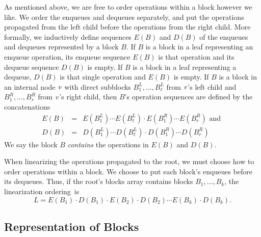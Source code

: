 As mentioned above, we are free to order operations within a block however we like.
We order the enqueues and dequeues separately, and put the 
operations propagated from the left child before the operations from the right child.
More formally, we inductively define sequences $E(B)$ and $D(B)$ of the enqueues and dequeues
represented by a block $B$.
If $B$ is a block in a leaf representing an enqueue operation, its enqueue sequence $E(B)$ is that operation
and its dequeue sequence $D(B)$ is empty.  If $B$ is a block in a leaf representing a dequeue, $D(B)$ is that single operation and $E(B)$ is empty.
If $B$ is a block in an internal node $\mbox{\textnormal{\textit{v}}}$ with direct subblocks $B^L_1, \ldots, B^L_\ell$ from 
$\mbox{\textnormal{\textit{v}}}$'s left child
and $B^R_1,\ldots,B^R_r$ from $\mbox{\textnormal{\textit{v}}}$'s right child, then $B$'s operation sequences are defined by the concatenations 
\begin{eqnarray}
E(B) &=& E(B^L_1)\cdots E(B^L_\ell)\cdot E(B^R_1) \cdots E(B^R_r) \mbox{ and }\nonumber\\
D(B) &=& D(B^L_1)\cdots D(B^L_\ell)\cdot D(B^R_1) \cdots D(B^R_r)\label{defSeqs}
\end{eqnarray}
We say the block $B$ \emph{contains} the operations in $E(B)$ and $D(B)$.

When linearizing the operations propagated to the root, we must
choose how to order operations within a block.  
We choose to put
each block's enqueues before its dequeues.
Thus, if the root's blocks array contains blocks $B_1, \ldots, B_k$, the 
linearization ordering~is 
\begin{equation}
L=E(B_1)\cdot D(B_1) \cdot E(B_2) \cdot D(B_2) \cdots E(B_k) \cdot D(B_k).
\label{linearization}
\end{equation}

\subsection{Representation of Blocks}
\label{sec:fields}

